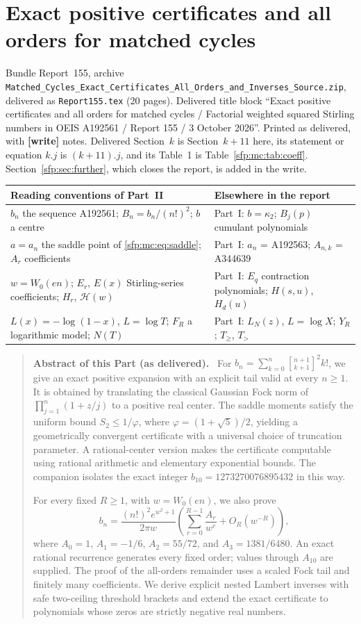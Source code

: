 \documentclass[11pt,letterpaper]{article}
\numberwithin{equation}{section}
\theoremstyle{definition}\newtheorem{definition}[theorem]{Definition}
\theoremstyle{remark}\newtheorem{remark}[theorem]{Remark}
\newcommand{\sone}[2]{\genfrac{[}{]}{0pt}{}{#1}{#2}}
\newcommand{\stir}{\sone}
\newcommand{\file}[1]{\nolinkurl{#1}}
\newenvironment{partabstract}{\begin{quote}\small\noindent\textbf{Abstract of this Part (as delivered).}\ }{\end{quote}}
\newcommand{\partsource}[1]{\par\noindent\begin{minipage}{\textwidth}\small #1\end{minipage}\par\medskip}
\begin{document}
\part{Exact positive certificates and all orders for matched cycles}\label{sfp:mc:part}
\partsource{Bundle Report~155, archive \file{Matched_Cycles_Exact_Certificates_All_Orders_and_Inverses_Source.zip}, delivered as \file{Report155.tex} (20 pages). Delivered title block ``Exact positive certificates and all orders for matched cycles / Factorial weighted squared Stirling numbers in OEIS A192561 / Report 155 / 3 October 2026''. Printed as delivered, with \textbf{[write]} notes. Delivered Section~$k$ is Section~$k+11$ here, its statement or equation $k.j$ is $(k+11).j$, and its Table~1 is Table~\ref{sfp:mc:tab:coeff}. Section~\ref{sfp:sec:further}, which closes the report, is added in the write.}
\begin{center}
\small
\begin{tabular}{@{}>{\raggedright\arraybackslash}p{} >{\raggedright\arraybackslash}p{}@{}}
\toprule
Reading conventions of Part~II & Elsewhere in the report\\
\midrule
$b_n$ the sequence A192561; $B_n=b_n/(n!)^2$; $b$ a centre & Part~I: $b=\kappa_2$; $B_j(p)$ cumulant polynomials\\
$a=a_n$ the saddle point of \eqref{sfp:mc:eq:saddle}; $A_r$ coefficients & Part~I: $a_n$ = A192563; $A_{n,k}$ = A344639\\
$w=W_0(en)$; $E_r$, $E(x)$ Stirling-series coefficients; $H_r$, $\mathcal H(w)$ & Part~I: $E_q$ contraction polynomials; $H(s,u)$, $H_d(u)$\\
$L(x)=-\log(1-x)$, $L=\log T$; $F_R$ a logarithmic model; $N(T)$ & Part~I: $L_N(z)$, $L=\log X$; $Y_R$; $T_\ge$, $T_>$\\
\bottomrule
\end{tabular}
\end{center}
\begin{partabstract}
For $b_n=\sum_{k=0}^{n}\stir{n+1}{k+1}^{\!2}k!$, we give an exact
positive expansion with an explicit tail valid at every $n\geq1$.
It is obtained by translating the classical Gaussian Fock norm of
$\prod_{j=1}^{n}(1+z/j)$ to a positive real center. The saddle moments
satisfy the uniform bound $S_2\leq1/\varphi$, where
$\varphi=(1+\sqrt5)/2$, yielding a geometrically convergent certificate
with a universal choice of truncation parameter. A rational-center
version makes the certificate computable using rational arithmetic
and elementary exponential bounds. The companion isolates the exact
integer $b_{10}=1273270076895432$ in this way.

For every fixed $R\geq1$, with $w=W_0(en)$, we also prove
\[
 b_n=\frac{(n!)^2e^{w^2+1}}{2\pi w}
 \left(\sum_{r=0}^{R-1}\frac{A_r}{w^r}+O_R(w^{-R})\right),
\]
where $A_0=1$, $A_1=-1/6$, $A_2=55/72$, and
$A_3=1381/6480$. An exact rational recurrence generates every fixed
order; values through $A_{10}$ are supplied. The proof of the
all-orders remainder uses a scaled Fock tail and finitely many
coefficients. We derive explicit nested Lambert inverses with safe
two-ceiling threshold brackets and extend the exact certificate to
polynomials whose zeros are strictly negative real numbers.
\end{partabstract}
\end{document}
